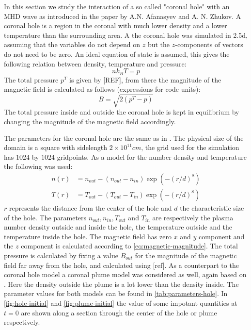 In this section we study the interaction of a so called "coronal hole" with an MHD wave as introduced in the paper \cite{coronal-hole} by A.N. Afanasyev and A. N. Zhukov. 
A coronal hole is a region in the coronal with much lower density and a lower temperature than the surrounding area.
A the coronal hole was simulated in 2.5d, assuming that the variables do not depend on $z$ but the $z$-components of vectors do not need to be zero.
An ideal equation of state is assumed, this gives the following relation between density, temperature and pressure:
\begin{equation}
	nk_BT = p
	\label{eq:ideal-gas}
\end{equation}
The total pressure $p^T$ is given by [REF], from there the magnitude of the magnetic field is calculated as follows (expressions for code units):
\begin{equation}
	B = \sqrt{2 \left( p^T-p \right) }
	\label{eq:magnetic-magnitude}
\end{equation}
The total pressure inside and outside the coronal hole is kept in equilibrium by changing the magnitude of the magnetic field accordingly.

The parameters for the coronal hole are the same as in \cite{coronal-hole}. 
The physical size of the domain is a square with sidelength $2\times 10^{11}cm$, the grid used for the simulation has $1024$ by $1024$ gridpoints. As a model for the number density and temperature the following was used:
\begin{equation}
	\label{eq:hole-model}
	\begin{split}
		n(r) &= n_{out} - (n_{out}-n_{in})\exp \left( -(r/d)^8 \right)\\
		T(r) &= T_{out} - (T_{out}-T_{in})\exp \left( -(r/d)^8 \right) 
	\end{split}
\end{equation}
$r$ represents the distance from the center of the hole and $d$ the characteristic size of the hole. 
The parameters $n_{out}, n_{in}, T_{out}$ and $T_{in}$ are respectively the plasma number density outside and inside the hole, the temperature outside and the temperature inside the hole. 
The magnetic field has zero $x$ and $y$ component and the $z$ component is calculated according to \cref{eq:magnetic-magnitude}.
The total pressure is calculated by fixing a value $B_{out}$ for the magnitude of the magnetic field far away from the hole, and calculated using [ref].
As a counterpart to the coronal hole model a coronal plume model was considered as well, again based on \cite{coronal-hole}.
Here the density outside the plume is a lot lower than the density inside.
The parameter values for both models can be found in \cref{tab:parameters-hole}.
In \cref{fig:hole-initial} and \cref{fig:plume-initial} the value of some impotant quantities at $t=0$ are shown along a section through the center of the hole or plume respectively.


